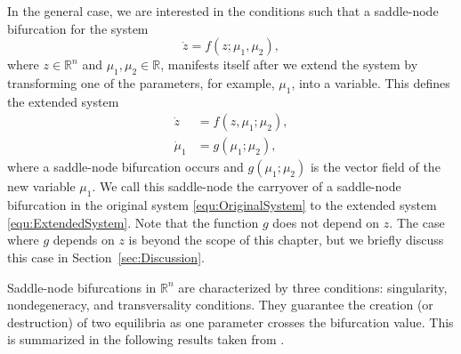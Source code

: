 \documentclass[12pt]{article}
\begin{document}
In the general case, we are interested in the conditions such that a saddle-node bifurcation for the system
\begin{equation}
    \dot z = f(z;\mu_{1},\mu_{2}),
    \label{equ:OriginalSystem}
\end{equation}
where $z\in\mathbb{R}^{n}$ and $\mu_{1},\mu_{2}\in\mathbb{R}$, manifests itself after we extend the system by transforming one of the parameters, for example, $\mu_{1}$, into a variable. This defines the extended system
\begin{equation}
    \left. \begin{aligned}
    \dot z &= f(z,\mu_{1}; \mu_{2}), \\
    \dot \mu_{1} &= g(\mu_{1}; \mu_{2}),
    \end{aligned} \right.
    \label{equ:ExtendedSystem}
\end{equation}
where a saddle-node bifurcation occurs and $g(\mu_{1}; \mu_{2})$ is the vector field of the new variable $\mu_{1}$. We call this saddle-node the carryover of a saddle-node bifurcation in the original system \eqref{equ:OriginalSystem} to the extended system \eqref{equ:ExtendedSystem}. Note that the function $g$ does not depend on $z$. The case where $g$ depends on $z$ is beyond the scope of this chapter, but we briefly discuss this case in Section~\ref{sec:Discussion}.

Saddle-node bifurcations in $\mathbb{R}^{n}$ are characterized by three conditions: singularity, nondegeneracy, and transversality conditions. They guarantee the creation (or destruction) of two equilibria as one parameter crosses the bifurcation value. This is summarized in the following results taken from \citet[Ch. 8]{Meiss2007}.
\end{document}

